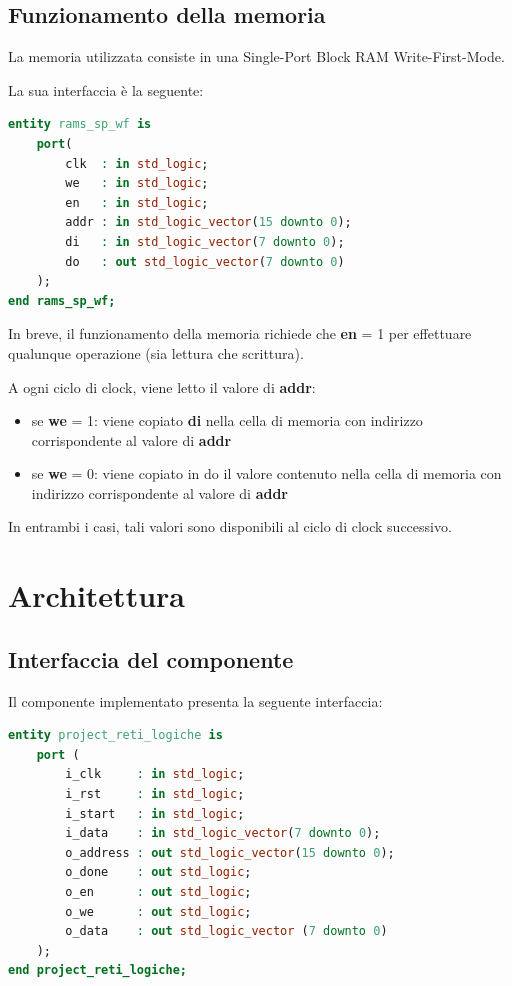 \documentclass[a4paper, 12pt]{article}
\begin{document}
\newpage
\subsection{Funzionamento della memoria}
La memoria utilizzata consiste in una Single-Port Block RAM Write-First-Mode.

\bigskip\noindent
La sua interfaccia è la seguente:
\begin{lstlisting}[language=VHDL]
entity rams_sp_wf is
    port(
        clk  : in std_logic;
        we   : in std_logic;
        en   : in std_logic;
        addr : in std_logic_vector(15 downto 0);
        di   : in std_logic_vector(7 downto 0);
        do   : out std_logic_vector(7 downto 0)
    );
end rams_sp_wf;
\end{lstlisting}

\bigskip\noindent
In breve, il funzionamento della memoria richiede che \textbf{en} = 1 per effettuare qualunque operazione (sia lettura che scrittura). 

\bigskip\noindent
A ogni ciclo di clock, viene letto il valore di \textbf{addr}:
\begin{itemize}
    \item se \textbf{we} = 1: viene copiato \textbf{di} nella cella di memoria con indirizzo corrispondente al valore di \textbf{addr}
    \item se \textbf{we} = 0: viene copiato in do il valore contenuto nella cella di memoria con indirizzo corrispondente al valore di \textbf{addr}
\end{itemize}

\bigskip\noindent
In entrambi i casi, tali valori sono disponibili al ciclo di clock successivo.


\newpage
\section{Architettura}
\subsection{Interfaccia del componente}
Il componente implementato presenta la seguente interfaccia:

\begin{lstlisting}[language=VHDL]
entity project_reti_logiche is
    port (
        i_clk     : in std_logic;
        i_rst     : in std_logic;
        i_start   : in std_logic;
        i_data    : in std_logic_vector(7 downto 0);
        o_address : out std_logic_vector(15 downto 0);
        o_done    : out std_logic;
        o_en      : out std_logic;
        o_we      : out std_logic;
        o_data    : out std_logic_vector (7 downto 0)
    );
end project_reti_logiche;
\end{lstlisting}
\end{document}
